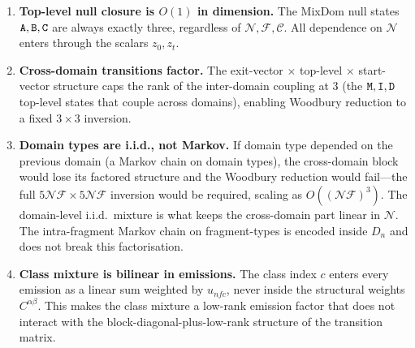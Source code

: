 \documentclass{article}
\newcommand\dom{n}
\newcommand\ndom{\mathcal{N}}
\newcommand\nfrag{\mathcal{F}}
\newcommand\classdist{u}
\newcommand\evoltime{t}
\newcommand\emptyseg{z}
\newcommand\mat{{\tt M}}
\newcommand\ins{{\tt I}}
\newcommand\del{{\tt D}}
\newcommand\mnull{{\tt A}}
\newcommand\inull{{\tt B}}
\newcommand\dnull{{\tt C}}
\newcommand\frag{f}
\newcommand\class{c}
\newcommand\nclasses{\mathcal{C}}
\begin{document}
\begin{enumerate}
\item \textbf{Top-level null closure is $O(1)$ in dimension.}
  The MixDom null states $\mnull, \inull, \dnull$ are always exactly
  three, regardless of $\ndom, \nfrag, \nclasses$. All dependence on
  $\ndom$ enters through the scalars $\emptyseg_0, \emptyseg_\evoltime$.

\item \textbf{Cross-domain transitions factor.}
  The exit-vector $\times$ top-level $\times$ start-vector structure
  caps the rank of the inter-domain coupling at 3
  (the $\mat, \ins, \del$ top-level states that couple across domains),
  enabling Woodbury reduction to a fixed $3 \times 3$ inversion.

\item \textbf{Domain types are i.i.d., not Markov.}
  If domain type depended on the previous domain (a Markov chain on
  domain types), the cross-domain block would lose its factored
  structure and the Woodbury reduction would fail---the full
  $5\ndom\nfrag \times 5\ndom\nfrag$ inversion would be required,
  scaling as $O((\ndom\nfrag)^3)$. The domain-level i.i.d.\ mixture
  is what keeps the cross-domain part linear in $\ndom$. The
  intra-fragment Markov chain on fragment-types is encoded inside
  $D_\dom$ and does not break this factorisation.

\item \textbf{Class mixture is bilinear in emissions.}
  The class index $\class$ enters every emission as a linear sum
  weighted by $\classdist_{\dom\frag\class}$, never inside the
  structural weights $C^{\alpha\beta}$. This makes the class mixture
  a low-rank emission factor that does not interact with the
  block-diagonal-plus-low-rank structure of the transition matrix.
\end{enumerate}

\ifdefined\INCLUDEDFROMTKF\else
\end{document}
